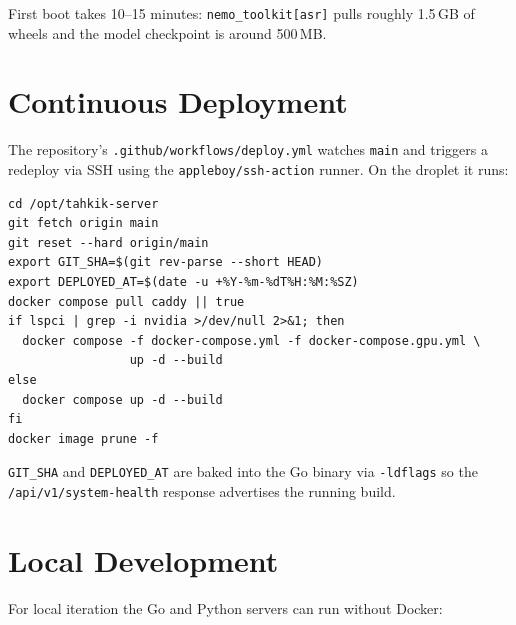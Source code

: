 First boot takes 10--15 minutes: \texttt{nemo\_toolkit[asr]} pulls roughly 1.5\,GB of wheels and the model checkpoint is around 500\,MB.

\section{Continuous Deployment}

The repository's \texttt{.github/workflows/deploy.yml} watches \texttt{main} and triggers a redeploy via SSH using the \texttt{appleboy/ssh-action} runner. On the droplet it runs:

\begin{lstlisting}[caption={GitHub Actions redeploy script}]
cd /opt/tahkik-server
git fetch origin main
git reset --hard origin/main
export GIT_SHA=$(git rev-parse --short HEAD)
export DEPLOYED_AT=$(date -u +%Y-%m-%dT%H:%M:%SZ)
docker compose pull caddy || true
if lspci | grep -i nvidia >/dev/null 2>&1; then
  docker compose -f docker-compose.yml -f docker-compose.gpu.yml \
                 up -d --build
else
  docker compose up -d --build
fi
docker image prune -f
\end{lstlisting}

\texttt{GIT\_SHA} and \texttt{DEPLOYED\_AT} are baked into the Go binary via \texttt{-ldflags} so the \texttt{/api/v1/system-health} response advertises the running build.

\section{Local Development}

For local iteration the Go and Python servers can run without Docker:




